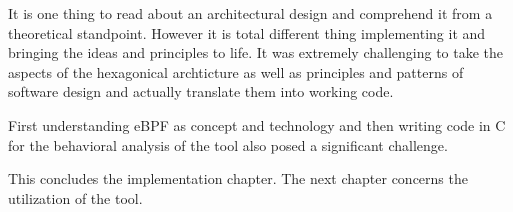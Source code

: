 It is one thing to read about an architectural design and comprehend it from a theoretical standpoint. However it is total different thing implementing it and bringing the ideas and principles to life. It was extremely challenging to take the aspects of the hexagonical archticture as well as principles and patterns of software design and actually translate them into working code. \newline 

First understanding eBPF as concept and technology and then writing code in C for the behavioral analysis of the tool also posed a significant challenge. \newline

This concludes the implementation chapter. The next chapter concerns the utilization of the tool.

